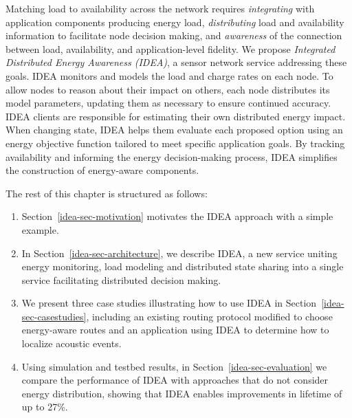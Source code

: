 Matching load to availability across the network requires
\textit{integrating} with application components producing energy load,
\textit{distributing} load and availability information to facilitate node
decision making, and \textit{awareness} of the connection between load,
availability, and application-level fidelity. We propose \textit{Integrated
Distributed Energy Awareness (IDEA)}, a sensor network service addressing
these goals. IDEA monitors and models the load and charge rates on each node.
To allow nodes to reason about their impact on others, each node distributes
its model parameters, updating them as necessary to ensure continued
accuracy. IDEA clients are responsible for estimating their own distributed
energy impact. When changing state, IDEA helps them evaluate each proposed
option using an energy objective function tailored to meet specific
application goals. By tracking availability and informing the energy
decision-making process, IDEA simplifies the construction of energy-aware
components.

The rest of this chapter is structured as follows:

\begin{enumerate}

\item Section~\ref{idea-sec-motivation} motivates the IDEA approach with a
simple example.

\item In Section~\ref{idea-sec-architecture}, we describe IDEA, a new service
uniting energy monitoring, load modeling and distributed state sharing into a
single service facilitating distributed decision making.

\item We present three case studies illustrating how to use IDEA in
Section~\ref{idea-sec-casestudies}, including an existing routing protocol
modified to choose energy-aware routes and an application using IDEA to
determine how to localize acoustic events.

\item Using simulation and testbed results, in
Section~\ref{idea-sec-evaluation} we compare the performance of IDEA with
approaches that do not consider energy distribution, showing that IDEA
enables improvements in lifetime of up to 27\%.

\end{enumerate}
